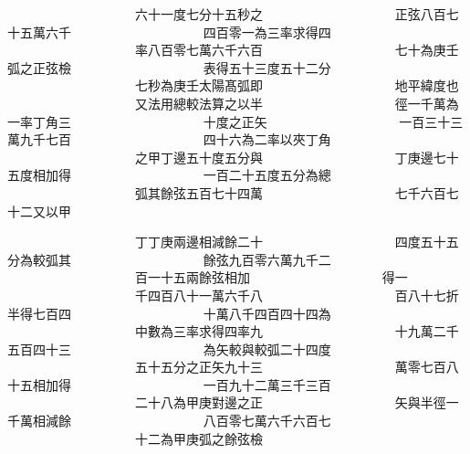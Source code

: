 \begin{正文}
　　　　　　　　　　六十一度七分十五秒之
　　　　　　　　　　正弦八百七十五萬六千
　　　　　　　　　　四百零一為三率求得四
　　　　　　　　　　率八百零七萬六千六百
　　　　　　　　　　七十為庚壬弧之正弦檢
　　　　　　　　　　表得五十三度五十二分
　　　　　　　　　　七秒為庚壬太陽髙弧即
　　　　　　　　　　地平緯度也
　　　　　　　　　　又法用總較法算之以半
　　　　　　　　　　徑一千萬為一率丁角三
　　　　　　　　　　十度之正矢
　　　　　　　　　　一百三十三萬九千七百
　　　　　　　　　　四十六為二率以夾丁角
　　　　　　　　　　之甲丁邊五十度五分與
　　　　　　　　　　丁庚邊七十五度相加得
　　　　　　　　　　一百二十五度五分為總
　　　　　　　　　　弧其餘弦五百七十四萬
　　　　　　　　　　七千六百七十二又以甲
\par
\end{正文}\clearpage
{}
\begin{正文}
　　　　　　　　　　丁丁庚兩邊相減餘二十
　　　　　　　　　　四度五十五分為較弧其
　　　　　　　　　　餘弦九百零六萬九千二
　　　　　　　　　　百一十五兩餘弦相加
　　　　　　　　　　得一
　　　　　　　　　　千四百八十一萬六千八
　　　　　　　　　　百八十七折半得七百四
　　　　　　　　　　十萬八千四百四十四為
　　　　　　　　　　中數為三率求得四率九
　　　　　　　　　　十九萬二千五百四十三
　　　　　　　　　　為矢較與較弧二十四度
　　　　　　　　　　五十五分之正矢九十三
　　　　　　　　　　萬零七百八十五相加得
　　　　　　　　　　一百九十二萬三千三百
　　　　　　　　　　二十八為甲庚對邊之正
　　　　　　　　　　矢與半徑一千萬相減餘
　　　　　　　　　　八百零七萬六千六百七
　　　　　　　　　　十二為甲庚弧之餘弦檢
\par
\end{正文}\clearpage
{}
